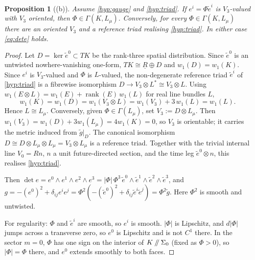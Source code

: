 \documentclass[11pt]{article}
\theoremstyle{canonmath}
\theoremstyle{canonpostulate}
\theoremstyle{canonproposition}
\theoremstyle{canonmath}
\newtheorem{proposition*}[theorem]{Proposition}
\theoremstyle{canonproposition}
\providecommand{\cutK}{\Klein\mathbin{/\mkern-5mu/}\Sigma_0}
\providecommand{\Lmu}{\mathcal{L}_\mu}
\providecommand{\Vb}{\mathcal{V}}
\providecommand{\Klein}{\mathcal{K}}
\providecommand{\R}{\mathbb{R}}
\def\mathbb#1{#1}%
\def\mathcal#1{#1}%
\begin{document}
\begin{proposition*}[(b)]\label{prop:triad}
Assume \ref{hyp:gauge} and \ref{hyp:triad}. If $e^i = \Phi\tilde{e}^i$ is $\Vb_3$-valued with $\Vb_3$ oriented, then $\Phi \in \Gamma(\Klein,\Lmu)$. Conversely, for every $\Phi\in\Gamma(\Klein,\Lmu)$ there are an oriented $\Vb_3$ and a reference triad realising \ref{hyp:triad}. In either case \eqref{eq:dete} holds.
\end{proposition*}

\begin{proof}
Let $D = \ker\tilde{e}^0 \subset T\Klein$ be the rank-three spatial distribution. Since $\tilde{e}^0$ is an untwisted nowhere-vanishing one-form, $T\Klein \cong \underline{\R}\oplus D$ and $w_1(D) = w_1(\Klein)$. Since $e^i$ is $\Vb_3$-valued and $\Phi$ is $L$-valued, the non-degenerate reference triad $\tilde{e}^i$ of \ref{hyp:triad} is a fibrewise isomorphism $D \to \Vb_3 \otimes L^* \cong \Vb_3\otimes L$. Using $w_1(E \otimes L) = w_1(E) + \operatorname{rank}(E)\, w_1(L)$ for real line bundles $L$,
\begin{equation}
w_1(\Klein) = w_1(D) = w_1(\Vb_3 \otimes L) = w_1(\Vb_3) + 3\,w_1(L) = w_1(L).
\label{eq:w1count}
\end{equation}
Hence $L \cong \Lmu$. Conversely, given $\Phi\in\Gamma(\Lmu)$, set $\Vb_3 := D\otimes\Lmu$. Then $w_1(\Vb_3) = w_1(D) + 3w_1(\Lmu) = 4w_1(\Klein) = 0$, so $\Vb_3$ is orientable; it carries the metric induced from $\tilde g|_D$. The canonical isomorphism $D \cong D\otimes\Lmu\otimes\Lmu = \Vb_3\otimes\Lmu$ is a reference triad. Together with the trivial internal line $\Vb_0 = \R n$, $n$ a unit future-directed section, and the time leg $\tilde e^0\otimes n$, this realises \ref{hyp:triad}.

Then $\det e = e^0 \wedge e^1\wedge e^2\wedge e^3 = |\Phi|\,\Phi^3\, \tilde{e}^0\wedge\tilde{e}^1\wedge\tilde{e}^2\wedge\tilde{e}^3$, and $g = -(e^0)^2 + \delta_{ij}e^ie^j = \Phi^2(-(\tilde e^0)^2 + \delta_{ij}\tilde{e}^i\tilde{e}^j) = \Phi^2\tilde{g}$. Here $\Phi^2$ is smooth and untwisted.

For regularity: $\Phi$ and $\tilde{e}^i$ are smooth, so $e^i$ is smooth. $|\Phi|$ is Lipschitz, and $d|\Phi|$ jumps across a transverse zero, so $e^0$ is Lipschitz and is not $C^1$ there. In the sector $m=0$, $\Phi$ has one sign on the interior of $\cutK$ (fixed as $\Phi > 0$), so $|\Phi| = \Phi$ there, and $e^0$ extends smoothly to both faces.
\end{proof}
\end{document}
